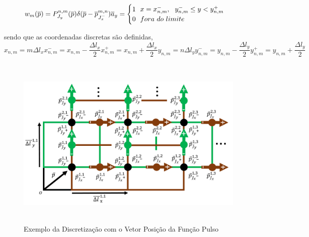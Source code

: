 \documentclass[
	12pt,				%
	openright,			%
	oneside,			%
	a4paper,			%
	english,			%
	brazil				%
	]{abntex2}
\begin{document}
\begin{apendicesenv}
\begin{equation}{\label{FunçaoTesteJx}}
     w_{m}(\overline{p})= P_{J_y}^{n,m}(\overline{p})\delta(\overline{p}-\overline{p}^{{m,n}}_{J^{-}_x})\overline{a}_y =
       \begin{cases}
      1 \ \ x=x_{n,m}^{-}, \ \ y_{n,m}^{-} \leq y < y_{n,m}^{+}  \\
      0 \ \ fora \ do \ limite \\
    \end{cases}  
 \end{equation}
 
sendo que as coordenadas discretas são definidas, 
 \begin{subequations}
    \begin{equation}
    x_{n,m}=m{\Delta l}_x
\end{equation}
    \begin{equation}
    x^{-}_{n,m}=x_{n,m}-\frac{{\Delta l}_x}{2}
\end{equation}
  \begin{equation}
    x^{+}_{n,m}=x_{n,m}+\frac{{\Delta l}_x}{2}
\end{equation}
      \begin{equation}
    y_{n,m}=n{\Delta l}_y
\end{equation}
  \begin{equation}
    y^{-}_{n,m}=y_{n,m}-\frac{{\Delta l}_y}{2}
\end{equation}
  \begin{equation}
    y^{+}_{n,m}=y_{n,m}+\frac{{\Delta l}_y}{2}
\end{equation}
\end{subequations}

\begin{figure}[htb]
 \label{PulsosVetorPosicaoIlustracao}
 \centering
  \begin{minipage}{\textwidth}
    \centering
    \caption{Exemplo da Discretização com o Vetor Posição da Função Pulso} \label{fig_minipage_imagem2}
    \includegraphics[width=14cm, height=8.5cm]{figures/PulsosVetorPosicaoIlustracao.png}
  \end{minipage}
  \hfill


\end{figure}
\end{apendicesenv}
\end{document}
